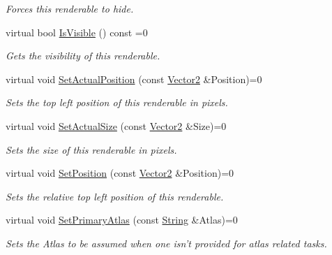 \begin{DoxyCompactItemize}
\begin{DoxyCompactList}\small\item\em Forces this renderable to hide. \item\end{DoxyCompactList}\item 
virtual bool \hyperlink{classMezzanine_1_1UI_1_1BasicRenderable_a443bdeb7d95e6b765a5548966d380ecf}{IsVisible} () const =0
\begin{DoxyCompactList}\small\item\em Gets the visibility of this renderable. \item\end{DoxyCompactList}\item 
virtual void \hyperlink{classMezzanine_1_1UI_1_1BasicRenderable_a4741dde07f7eddddcc3d611d6c803fad}{SetActualPosition} (const \hyperlink{classMezzanine_1_1Vector2}{Vector2} \&Position)=0
\begin{DoxyCompactList}\small\item\em Sets the top left position of this renderable in pixels. \item\end{DoxyCompactList}\item 
virtual void \hyperlink{classMezzanine_1_1UI_1_1BasicRenderable_a69c87db17cacc2980f68777258329531}{SetActualSize} (const \hyperlink{classMezzanine_1_1Vector2}{Vector2} \&Size)=0
\begin{DoxyCompactList}\small\item\em Sets the size of this renderable in pixels. \item\end{DoxyCompactList}\item 
virtual void \hyperlink{classMezzanine_1_1UI_1_1BasicRenderable_aab42dabeaeb7a56fb4b98ae8f7ab6afb}{SetPosition} (const \hyperlink{classMezzanine_1_1Vector2}{Vector2} \&Position)=0
\begin{DoxyCompactList}\small\item\em Sets the relative top left position of this renderable. \item\end{DoxyCompactList}\item 
virtual void \hyperlink{classMezzanine_1_1UI_1_1BasicRenderable_ab1195ccf1e8acf126aee6d06c1d9e93b}{SetPrimaryAtlas} (const \hyperlink{namespaceMezzanine_acf9fcc130e6ebf08e3d8491aebcf1c86}{String} \&Atlas)=0
\begin{DoxyCompactList}\small\item\em Sets the Atlas to be assumed when one isn't provided for atlas related tasks. \item\end{DoxyCompactList}\item 

\end{DoxyCompactItemize}
